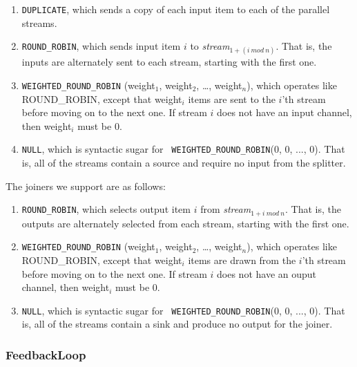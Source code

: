 \documentclass[draft]{article}
\begin{document}
\begin{enumerate}

\item {\tt DUPLICATE}, which sends a copy of each input item to each
of the parallel streams.

\item {\tt ROUND\_ROBIN}, which sends input item $i$ to {\it
stream$_{1+(i~mod~n)}$}.  That is, the inputs are alternately sent to
each stream, starting with the first one.

\item {\tt WEIGHTED\_ROUND\_ROBIN} (weight$_1$, weight$_2$, \dots,
weight$_n$), which operates like ROUND\_ROBIN, except that weight$_i$
items are sent to the $i$'th stream before moving on to the next one.
If stream $i$ does not have an input channel, then weight$_i$ must be
0.

\item {\tt NULL}, which is syntactic sugar for {\tt
WEIGHTED\_ROUND\_ROBIN}(0, 0, ..., 0).  That is, all of the streams
contain a source and require no input from the splitter.

\end{enumerate}

The joiners we support are as follows:

\begin{enumerate}

\item {\tt ROUND\_ROBIN}, which selects output item $i$ from {\it
stream$_{1+i~mod~n}$}.  That is, the outputs are alternately selected
from each stream, starting with the first one.

\item {\tt WEIGHTED\_ROUND\_ROBIN} (weight$_1$, weight$_2$, \dots,
weight$_n$), which operates like ROUND\_ROBIN, except that weight$_i$
items are drawn from the $i$'th stream before moving on to the next
one.  If stream $i$ does not have an ouput channel, then weight$_i$
must be 0.

\item {\tt NULL}, which is syntactic sugar for {\tt
WEIGHTED\_ROUND\_ROBIN}(0, 0, ..., 0).  That is, all of the streams
contain a sink and produce no output for the joiner.

\end{enumerate}

\subsubsection{FeedbackLoop}
\end{document}
